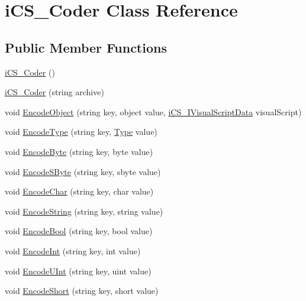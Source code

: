 \hypertarget{classi_c_s___coder}{\section{i\+C\+S\+\_\+\+Coder Class Reference}
\label{classi_c_s___coder}
}
\subsection*{Public Member Functions}
\begin{DoxyCompactItemize}
\item 
\hyperlink{classi_c_s___coder_a2fff2b63b4b2ad64d4616705e638ba55}{i\+C\+S\+\_\+\+Coder} ()
\item 
\hyperlink{classi_c_s___coder_a44eeb328a935c0695323472c4f28f6cf}{i\+C\+S\+\_\+\+Coder} (string archive)
\item 
void \hyperlink{classi_c_s___coder_acb574be63c94803dd91df2b67cd82f51}{Encode\+Object} (string key, object value, \hyperlink{interfacei_c_s___i_visual_script_data}{i\+C\+S\+\_\+\+I\+Visual\+Script\+Data} visual\+Script)
\item 
void \hyperlink{classi_c_s___coder_ad9260c7b409567247bef4c96e743f9ee}{Encode\+Type} (string key, \hyperlink{i_c_s___object_type_enum_8cs_ae6c3dd6d8597380b56d94908eb431547aa1fa27779242b4902f7ae3bdd5c6d508}{Type} value)
\item 
void \hyperlink{classi_c_s___coder_a9fae2d4b4bb9ddb1de250cf4f3f34f40}{Encode\+Byte} (string key, byte value)
\item 
void \hyperlink{classi_c_s___coder_adba2e48fdccdd250ba5846ffcdbe2f82}{Encode\+S\+Byte} (string key, sbyte value)
\item 
void \hyperlink{classi_c_s___coder_a7f5d97e6c040b7d4ca5151acf6b49e9e}{Encode\+Char} (string key, char value)
\item 
void \hyperlink{classi_c_s___coder_a3101660f2dd3713d632d3ed021a30cc2}{Encode\+String} (string key, string value)
\item 
void \hyperlink{classi_c_s___coder_ac7612c91b1597fa2aad52fe4a60ab2c8}{Encode\+Bool} (string key, bool value)
\item 
void \hyperlink{classi_c_s___coder_ad9453364d6e3311cfbe2cb339fcfafb3}{Encode\+Int} (string key, int value)
\item 
void \hyperlink{classi_c_s___coder_a53f1a37d688786e3ecb51267cf37f896}{Encode\+U\+Int} (string key, uint value)
\item 
void \hyperlink{classi_c_s___coder_a4e5bdc2e71552026c769986a9eeeb318}{Encode\+Short} (string key, short value)

\end{DoxyCompactItemize}
